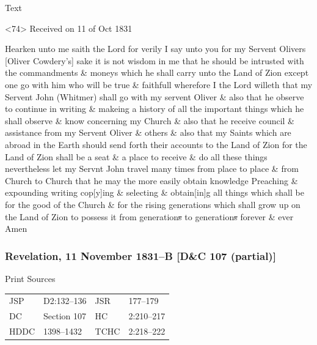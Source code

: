 {			\begin{description}
				\item[Text]
			\end{description}
			
				\begin{tightcenter}
				<74> Received on  11 of Oct 1831
				\end{tightcenter}
				
				Hearken unto me saith the Lord for verily I say unto you for my Servent Olivers [Oliver Cowdery's] sake it is not wisdom in me that he should be intrusted with the commandments \& moneys which he shall carry unto the Land of Zion except one go with him who will be true \& faithfull wherefore I the Lord willeth that my Servent John (Whitmer) shall go with my servent Oliver \& also that he observe to continue in writing \& makeing a history of all the important things which he shall observe \& know concerning my Church \& also that he receive council \& assistance from my Servent Oliver \& others \& also that my Saints which are abroad in the Earth should send forth their accounts to the Land of Zion for the Land of Zion shall be a seat \& a place to receive \& do all these things nevertheless let my Servnt John travel many times from place to place \& from Church to Church that he may the more easily obtain knowledge Preaching \& expounding writing cop[y]ing \& selecting \& obtain[in]g all things which shall be for the good of the Church \& for the rising generations which shall grow up on the Land of Zion to possess it from generation\sout{s} to generation\sout{s} forever \& ever Amen
				
		\subsubsection{Revelation, 11 November 1831--B [D\&C 107 (partial)]}
			\label{EMS-1831-JS-11-NOV-1831-B}
		
			\begin{description}
				\item[Print Sources]
			\end{description}

				\begin{tabular}{p{0.5in}p{1in}p{0.5in}p{1in}}
				JSP	 	& D2:132--136	& JSR 		& 177--179 \\
				DC	 	& Section 107 	& HC 		& 2:210--217 \\
				HDDC 	& 1398--1432	& TCHC 		& 2:218--222 \\
				\end{tabular}
			
}
